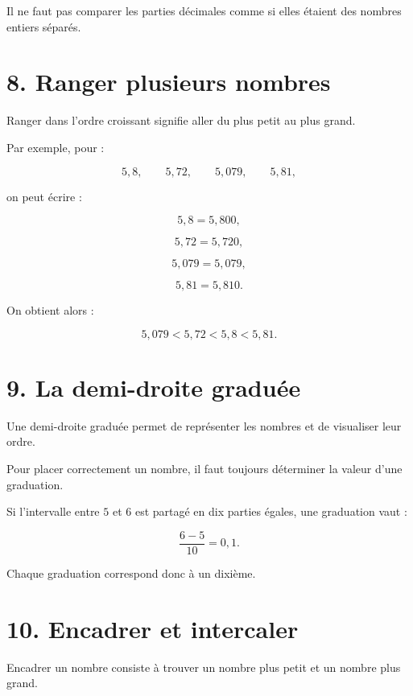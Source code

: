 Il ne faut pas comparer les parties décimales comme si elles étaient des nombres entiers séparés.

\section{8. Ranger plusieurs nombres}

Ranger dans l’ordre croissant signifie aller du plus petit au plus grand.

Par exemple, pour :

\[
5{,}8,\qquad5{,}72,\qquad5{,}079,\qquad5{,}81,
\]

on peut écrire :

\[
5{,}8=5{,}800,
\]

\[
5{,}72=5{,}720,
\]

\[
5{,}079=5{,}079,
\]

\[
5{,}81=5{,}810.
\]

On obtient alors :

\[
\boxed{
5{,}079<5{,}72<5{,}8<5{,}81
}.
\]

\section{9. La demi-droite graduée}

Une demi-droite graduée permet de représenter les nombres et de visualiser leur ordre.


Pour placer correctement un nombre, il faut toujours déterminer la valeur d’une graduation.

Si l’intervalle entre $5$ et $6$ est partagé en dix parties égales, une graduation vaut :

\[
\dfrac{6-5}{10}=0{,}1.
\]

Chaque graduation correspond donc à un dixième.

\section{10. Encadrer et intercaler}

Encadrer un nombre consiste à trouver un nombre plus petit et un nombre plus grand.

